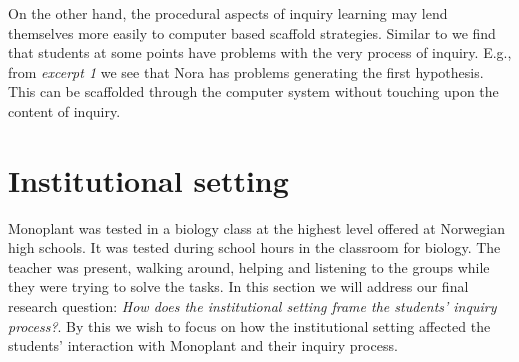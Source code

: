 On the other hand, the procedural aspects of inquiry learning may lend themselves more easily to computer based scaffold strategies. Similar to \citet{kluge2010simulation} we find that students at some points have problems with the very process of inquiry. E.g., from \emph{excerpt 1} we see that Nora has problems generating the first hypothesis. This can be scaffolded through the computer system without touching upon the content of inquiry. 














\section{Institutional setting}
Monoplant was tested in a biology class at the highest level offered at Norwegian high schools. It was tested during school hours in the classroom for biology. The teacher was present, walking around, helping and listening to the groups while they were trying to solve the tasks. In this section we will address our final research question: \emph{How does the institutional setting frame the students' inquiry process?}.
By this we wish to focus on how the institutional setting affected the students' interaction with Monoplant and their inquiry process. 

